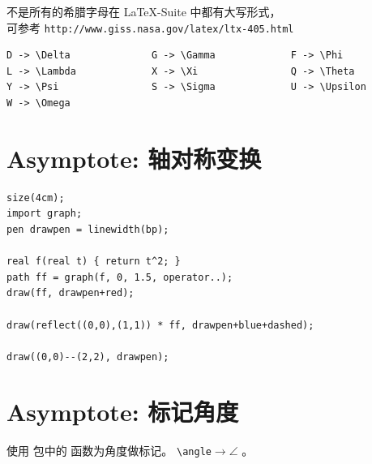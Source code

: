\documentclass[a4paper,11pt]{article}
\begin{document}
不是所有的希腊字母在 \LaTeX -Suite 中都有大写形式，\\
可参考 \verb+http://www.giss.nasa.gov/latex/ltx-405.html+
\begin{Verbatim}
D -> \Delta              G -> \Gamma             F -> \Phi
L -> \Lambda             X -> \Xi                Q -> \Theta
Y -> \Psi                S -> \Sigma             U -> \Upsilon
W -> \Omega
\end{Verbatim}
{\huge\makebox[0.7\textwidth][s]{\textcolor{red}{
$\Delta{}\ \Gamma{}\ \Phi{}\ \Lambda{}\ \Xi{}\ \Theta{}\ \Psi{}\ %
\Sigma{}\ \Upsilon{}\ \Omega$}}}

\section{Asymptote: 轴对称变换}
\begin{Verbatim}
size(4cm);
import graph;
pen drawpen = linewidth(bp);

real f(real t) { return t^2; }
path ff = graph(f, 0, 1.5, operator..);
draw(ff, drawpen+red);

draw(reflect((0,0),(1,1)) * ff, drawpen+blue+dashed);

draw((0,0)--(2,2), drawpen);
\end{Verbatim}

\section{Asymptote: 标记角度}
使用  包中的  函数为角度做标记。
\verb+\angle+$\to \angle$ 。
\end{document}
